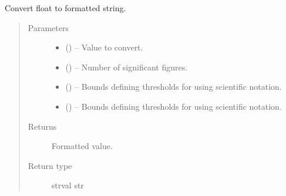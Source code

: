 \documentclass[letterpaper,10pt,english]{sphinxmanual}
\begin{document}

\begin{fulllineitems}
\label{\detokenize{references/write:nmrespy.write._strval}}
\sphinxAtStartPar
Convert float to formatted string.
\begin{quote}\begin{description}
\item[{Parameters}] \leavevmode\begin{itemize}
\item {} 
\sphinxAtStartPar
{} () – Value to convert.

\item {} 
\sphinxAtStartPar
{} () – Number of significant figures.

\item {} 
\sphinxAtStartPar
\sphinxstyleliteralstrong{\sphinxupquote{\sphinxhyphen{}}}\sphinxstyleliteralstrong{\sphinxupquote{ (}} () – Bounds defining thresholds for using scientific notation.

\item {} 
\sphinxAtStartPar
{} (\sphinxstyleliteralemphasis{\sphinxupquote{)}}) – Bounds defining thresholds for using scientific notation.

\end{itemize}

\item[{Returns}] \leavevmode
\sphinxAtStartPar
Formatted value.

\item[{Return type}] \leavevmode
\sphinxAtStartPar
strval \sphinxhyphen{} str

\end{description}\end{quote}

\end{fulllineitems}
\end{document}

